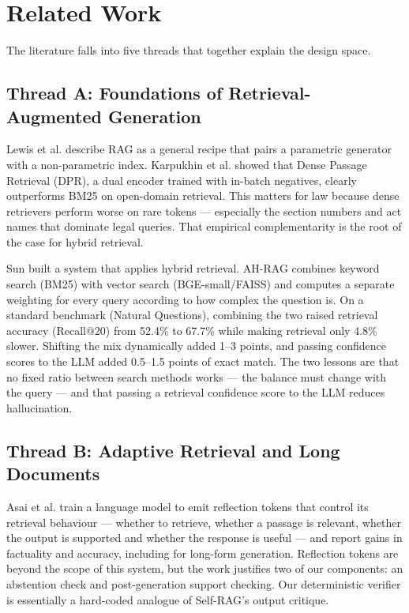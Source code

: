 \documentclass[conference]{IEEEtran}
\begin{document}
\section{Related Work}
\label{sec:related}

The literature falls into five threads that together explain the design space.

\subsection{Thread A: Foundations of Retrieval-Augmented Generation}

Lewis et al. \cite{lewis2020} describe RAG as a general recipe that pairs a parametric generator with a non-parametric index. Karpukhin et al. \cite{karpukhin2020} showed that Dense Passage Retrieval (DPR), a dual encoder trained with in-batch negatives, clearly outperforms BM25 on open-domain retrieval. This matters for law because dense retrievers perform worse on rare tokens --- especially the section numbers and act names that dominate legal queries. That empirical complementarity is the root of the case for hybrid retrieval.

Sun \cite{sun2025} built a system that applies hybrid retrieval. AH-RAG combines keyword search (BM25) with vector search (BGE-small/FAISS) and computes a separate weighting for every query according to how complex the question is. On a standard benchmark (Natural Questions), combining the two raised retrieval accuracy (Recall@20) from 52.4\% to 67.7\% while making retrieval only 4.8\% slower. Shifting the mix dynamically added 1--3 points, and passing confidence scores to the LLM added 0.5--1.5 points of exact match. The two lessons are that no fixed ratio between search methods works --- the balance must change with the query --- and that passing a retrieval confidence score to the LLM reduces hallucination.

\subsection{Thread B: Adaptive Retrieval and Long Documents}

Asai et al. \cite{asai2023} train a language model to emit reflection tokens that control its retrieval behaviour --- whether to retrieve, whether a passage is relevant, whether the output is supported and whether the response is useful --- and report gains in factuality and accuracy, including for long-form generation. Reflection tokens are beyond the scope of this system, but the work justifies two of our components: an abstention check and post-generation support checking. Our deterministic verifier is essentially a hard-coded analogue of Self-RAG's output critique.
\end{document}
